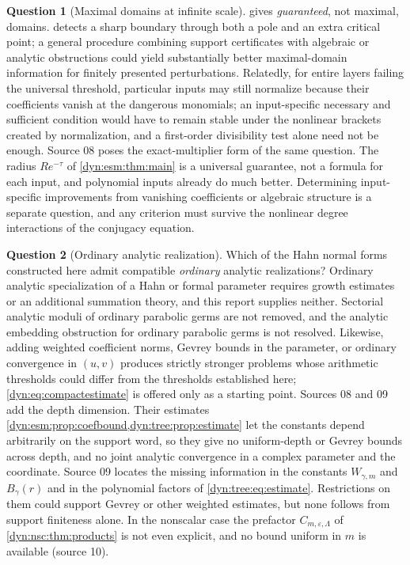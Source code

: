 \documentclass[11pt,letterpaper]{article}
\theoremstyle{definition}
\newtheorem{question}[question]{Question}
\theoremstyle{remark}
\newcommand{\eps}{\varepsilon}
\numberwithin{equation}{section}
\begin{document}
\begin{question}[Maximal domains at infinite scale]\label{dyn:q:maximal}
 gives \emph{guaranteed}, not maximal, domains.
 detects a sharp boundary through both a pole and an
extra critical point; a general procedure combining support certificates
with algebraic or analytic obstructions could yield substantially better
maximal-domain information for finitely presented perturbations. Relatedly,
for entire layers failing the universal threshold, particular inputs may
still normalize because their coefficients vanish at the dangerous
monomials; an input-specific necessary and sufficient condition would have
to remain stable under the nonlinear brackets created by normalization, and
a first-order divisibility test alone need not be enough. Source 08 poses
the exact-multiplier form of the same question. The radius $Re^{-\tau}$ of
\cref{dyn:esm:thm:main} is a universal guarantee, not a formula for each
input, and polynomial inputs already do much better. Determining
input-specific improvements from vanishing coefficients or algebraic
structure is a separate question, and any criterion must survive the
nonlinear degree interactions of the conjugacy equation.
\end{question}

\begin{question}[Ordinary analytic realization]\label{dyn:q:realization}
Which of the Hahn normal forms constructed here admit compatible
\emph{ordinary} analytic realizations? Ordinary analytic specialization of
a Hahn or formal parameter requires growth estimates or an additional
summation theory, and this report supplies neither. Sectorial analytic
moduli of ordinary parabolic germs are not removed, and the analytic
embedding obstruction for ordinary parabolic germs is not resolved.
Likewise, adding weighted coefficient norms, Gevrey bounds in the
parameter, or ordinary convergence in $(u,v)$ produces strictly stronger
problems whose arithmetic thresholds could differ from the thresholds
established here; \eqref{dyn:eq:compactestimate} is offered only as a
starting point. Sources 08 and 09 add the depth dimension. Their estimates
\cref{dyn:esm:prop:coefbound,dyn:tree:prop:estimate} let the constants
depend arbitrarily on the support word, so they give no uniform-depth or
Gevrey bounds across depth, and no joint analytic convergence in a complex
parameter and the coordinate. Source 09 locates the missing information in
the constants $W_{\gamma,m}$ and $B_\gamma(r)$ and in the polynomial factors
of \eqref{dyn:tree:eq:estimate}. Restrictions on them could support Gevrey
or other weighted estimates, but none follows from support finiteness alone.
In the nonscalar case the prefactor $C_{m,\eps,\Lambda}$ of
\cref{dyn:nsc:thm:products} is not even explicit, and no bound uniform in
$m$ is available (source 10).
\end{question}
\end{document}
